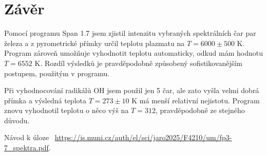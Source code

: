 \documentclass[a4paper,11pt]{article}
\begin{document}
\newpage

\section{Závěr}

Pomocí programu Span 1.7 jsem zjistil intenzitu vybraných spektrálních čar par železa a z pyrometrické přímky určil teplotu plazmatu na $ T = 6000 \pm 500 $ K. Program zároveň umožňuje vyhodnotit teplotu automaticky, odkud mám hodnotu $ T = 6552 $ K. Rozdíl výsledků je pravděpodobně způsobený sofistikovanějším postupem, použitým v programu. 

Při vyhodnocování radikálů OH jsem použil jen 5 čar, ale zato vyšla velmi dobrá přímka a výsledná teplota $ T = 273 \pm 10 $ K má menší relativní nejistotu. Program znovu vyhodnotil teplotu o něco výš na $ T = 312 $, pravděpodobně ze stejného důvodu.

\begin{thebibliography}{0}
 Návod k úloze ~\url{https://is.muni.cz/auth/el/sci/jaro2025/F4210/um/fp3-7_spektra.pdf}.   
\end{thebibliography}
\end{document}
